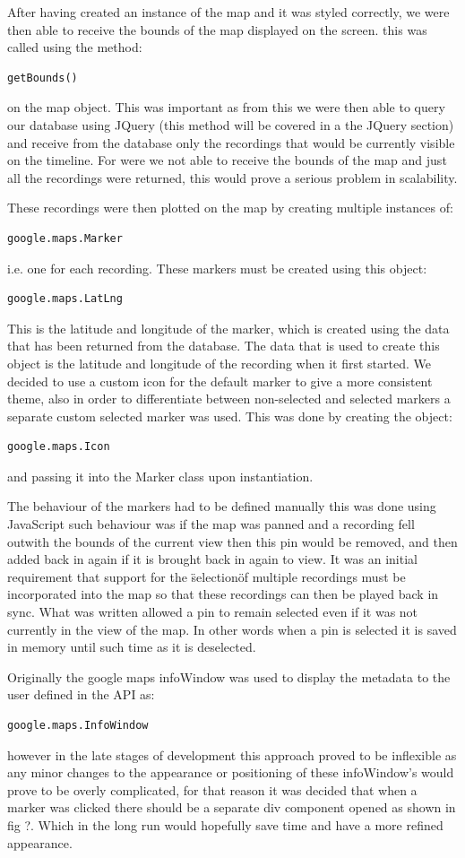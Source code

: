 \documentclass{l3proj}
\begin{document}
After having created an instance of the map and it was styled
correctly, we were then able to receive the bounds of the map
displayed on the screen. this was called using the method:
\begin{verbatim}
getBounds()
\end{verbatim}
on the map object. This was important as from this we were then able to query our
database using JQuery (this method will be covered in a the JQuery
section) and receive from the database only the recordings that would
be currently visible on the timeline. For were we not able to receive
the bounds of the map and just all the recordings were returned, this
would prove a serious problem in scalability.

These recordings were then plotted on the map by creating multiple
instances of:
\begin{verbatim}
google.maps.Marker
\end{verbatim}
i.e. one for each recording. These markers must be created using this
object:
\begin{verbatim}
google.maps.LatLng
\end{verbatim}
This is the latitude and longitude of the marker, which is created
using the data that has been returned from the database. The data that
is used to create this object is the latitude and longitude of the
recording when it first started.
We decided to use a custom icon for the default marker to give a more
consistent theme, also in order to differentiate between non-selected
and selected markers a separate custom selected marker was used. This
was done by creating the object:
\begin{verbatim}
google.maps.Icon
\end{verbatim}
and passing it into the Marker class upon instantiation.

The behaviour of the markers had to be defined manually this was done
using JavaScript such behaviour was if the map was panned and a
recording fell outwith the bounds of the current view then this pin
would be removed, and then added back in again if it is brought back
in again to view. It was an initial requirement that support for the
\"selection\" of multiple recordings must be incorporated into the map
so that these recordings can then be played back in sync. What was
written allowed a pin to remain selected even if it was not currently
in the view of the map. In other words when a pin is selected it is
saved in memory until such time as it is deselected.

Originally the google maps infoWindow was used to display the metadata
to the user defined in the API as:
\begin{verbatim}
google.maps.InfoWindow
\end{verbatim}
however in the late stages of development this approach proved to be
inflexible as any minor changes to the appearance or positioning of
these infoWindow’s would prove to be overly complicated, for that
reason it was decided that when a marker was clicked there should be a
separate div component opened as shown in fig ?. Which in the long run
would hopefully save time and have a more refined appearance.
\end{document}
